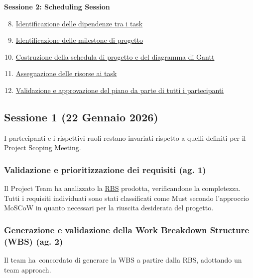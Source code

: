 \documentclass[11pt,a4paper]{article}
\providecommand{\tightlist}{\setlength{\itemsep}{0pt}\setlength{\parskip}{0pt}}
\begin{document}
\medskip\noindent\textbf{Sessione 2: Scheduling Session}\par\nopagebreak\smallskip

\begin{enumerate}
\setcounter{enumi}{7}
\tightlist
\item
  \hyperref[h.11ufs4hmubt1]{Identificazione delle dipendenze tra i task}
\item
  \hyperref[h.m11igq520jw0]{Identificazione delle milestone di progetto}
\item
  \hyperref[h.a1n4ykbpaol8]{Costruzione della schedula di progetto e del diagramma di Gantt}
\item
  \hyperref[h.b2ob6yka6cor]{Assegnazione delle risorse ai task}
\item
  \hyperref[h.cle2qelgq5p7]{Validazione e approvazione del piano da parte di tutti i partecipanti}
\end{enumerate}

\subsection{\texorpdfstring{{Sessione 1 (22 Gennaio 2026)}}{Sessione 1 (22 Gennaio 2026)}}\label{h.vxhmpr7s56i9}

{I partecipanti e i rispettivi ruoli restano invariati rispetto a quelli definiti per il Project Scoping Meeting.}

\subsubsection{\texorpdfstring{{Validazione e prioritizzazione dei requisiti (ag. 1)}}{Validazione e prioritizzazione dei requisiti (ag. 1)}}\label{h.4q3lmdu7d554}

{Il Project Team ha analizzato la \hyperref[sec:rbs]{RBS} prodotta, verificandone la completezza. Tutti i requisiti individuati sono stati classificati come }{Must }{secondo l’approccio MoSCoW in quanto necessari per la riuscita desiderata del progetto.}

\subsubsection{\texorpdfstring{{Generazione e validazione della Work Breakdown Structure (WBS) }{(ag. 2)}}{Generazione e validazione della Work Breakdown Structure (WBS) (ag. 2)}}\label{h.x8762hc8x3x7}

{Il team ha}{~concordato di generare la WBS a partire dalla RBS, adottando un team approach.}
\end{document}
